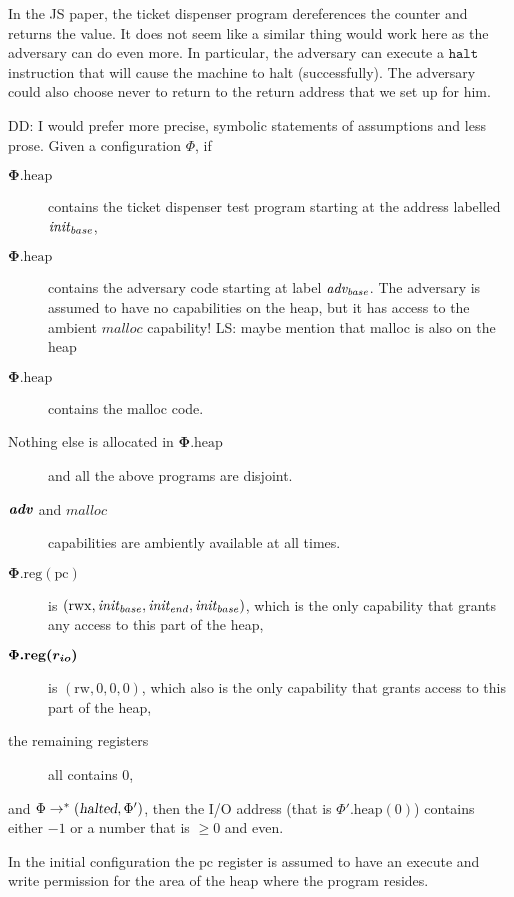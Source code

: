 \documentclass{article}
\newcommand\lau[1]{{\color{purple} \sf \footnotesize {LS: #1}}}
\newcommand\dominique[1]{{\color{purple} \sf \footnotesize {DD: #1}}}
\newcommand{\pcreg}{\mathrm{pc}}
\newcommand{\plainproj}[1]{\mathrm{#1}}
\newcommand{\memheap}[1][\Phi]{#1.\plainproj{heap}}
\newcommand{\memreg}[1][\Phi]{#1.\plainproj{reg}}
\newcommand{\halted}{\textsl{halted}}
\newcommand{\codelabel}[1]{\mathit{#1}}
\newcommand{\malloc}{\codelabel{malloc}}
\newcommand{\halt}{\instr{halt}}
\newcommand{\instr}[1]{\mathtt{#1}}
\newcommand{\plainperm}[1]{\mathrm{#1}}
\newcommand{\readwrite}{\plainperm{rw}}
\newcommand{\rwx}{\plainperm{rwx}}
\begin{document}
In the JS paper, the ticket dispenser program dereferences the counter and returns the value. It does not seem like a similar thing would work here as the adversary can do even more. In particular, the adversary can execute a $\halt$ instruction that will cause the machine to halt (successfully). The adversary could also choose never to return to the return address that we set up for him.
\begin{lemma}\dominique{I would prefer more precise, symbolic statements of assumptions and less prose.}
\label{lem:tckt-disp}
 Given a configuration $\Phi$, if
 \begin{description}
 \item[$\boldsymbol \memheap$] contains the ticket dispenser test program starting at the address labelled $\mathit{init}_{base}$, 
 \item[$\boldsymbol \memheap$] contains the adversary code starting at label $\mathit{adv_{base}}$. The adversary is assumed to have no capabilities on the heap, but it has access to the ambient $\malloc$ capability! \lau{maybe mention that malloc is also on the heap}
 \item[$\boldsymbol \memheap$] contains the malloc code.
 \item[Nothing else is allocated in $\boldsymbol \memheap$] and all the above programs are disjoint.
 \item[$\boldsymbol{\adv}$ and $\boldsymbol{ \codelabel{malloc}}$] capabilities are ambiently available at all times.
 \item[$\boldsymbol{ \memreg(\pcreg)}$] is $(\rwx,\initb,\inite,\initb)$, which is the only capability that grants any access to this part of the heap,
 \item[$\boldsymbol{ \memreg(\rio)}$] is $(\readwrite,0,0,0)$, which also is the only capability that grants access to this part of the heap, 
 \item[the remaining registers] all contains 0,
 \end{description}
 and $\Phi \rightarrow^* (\halted,\Phi')$, then the I/O address (that is $\memheap[\Phi'](0)$) contains either $-1$ or a number that is $\geq 0$ and even.
\end{lemma}
In the initial configuration the $\pcreg$ register is assumed to have an execute and write permission for the area of the heap where the program resides.
\end{document}
